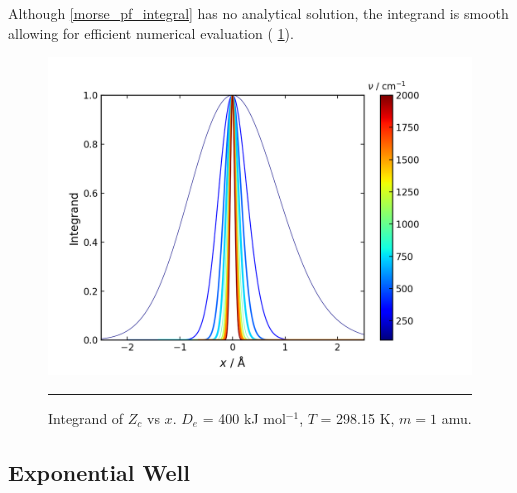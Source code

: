 \documentclass[../main.tex]{subfiles}
\begin{document}
Although \eqref{morse_pf_integral} has no analytical solution, the integrand is smooth allowing for efficient numerical evaluation (\figurename{ \ref{morse_pf_integrand_vs_x}}).

\begin{figure}[h!]
	\centering
	\includegraphics[width=12cm]{8/figs/morse_pf_integrand_vs_x}
	\vspace{0.2cm}
	\hrule
	\caption{Integrand of $Z_c$ vs $x$. $D_e$ = 400 kJ mol$^{-1}$, $T$ = 298.15 K, $m = 1$ amu.}
	\label{morse_pf_integrand_vs_x}
\end{figure}


\subsection{Exponential Well}
\end{document}
